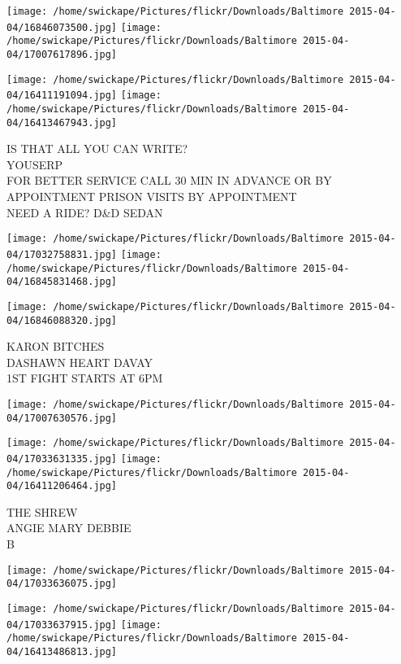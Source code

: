 \documentclass[10pt,letterpaper]{article}
\begin{document}
\texttt{[image: /home/swickape/Pictures/flickr/Downloads/Baltimore 2015-04-04/16846073500.jpg]}
\texttt{[image: /home/swickape/Pictures/flickr/Downloads/Baltimore 2015-04-04/17007617896.jpg]}

\texttt{[image: /home/swickape/Pictures/flickr/Downloads/Baltimore 2015-04-04/16411191094.jpg]}
\texttt{[image: /home/swickape/Pictures/flickr/Downloads/Baltimore 2015-04-04/16413467943.jpg]}

IS THAT ALL YOU CAN WRITE?\\
YOUSERP\\
FOR BETTER SERVICE CALL 30 MIN IN ADVANCE OR BY APPOINTMENT PRISON VISITS BY APPOINTMENT\\
NEED A RIDE?  D\&D SEDAN\\
\pagebreak

\texttt{[image: /home/swickape/Pictures/flickr/Downloads/Baltimore 2015-04-04/17032758831.jpg]}
\texttt{[image: /home/swickape/Pictures/flickr/Downloads/Baltimore 2015-04-04/16845831468.jpg]}

\texttt{[image: /home/swickape/Pictures/flickr/Downloads/Baltimore 2015-04-04/16846088320.jpg]}

KARON BITCHES\\
DASHAWN HEART DAVAY\\
1ST FIGHT STARTS AT 6PM\\
\pagebreak

\texttt{[image: /home/swickape/Pictures/flickr/Downloads/Baltimore 2015-04-04/17007630576.jpg]}

\vspace{0.25in}
\texttt{[image: /home/swickape/Pictures/flickr/Downloads/Baltimore 2015-04-04/17033631335.jpg]}
\texttt{[image: /home/swickape/Pictures/flickr/Downloads/Baltimore 2015-04-04/16411206464.jpg]}

THE SHREW\\
ANGIE MARY DEBBIE\\
B\\
\pagebreak

\texttt{[image: /home/swickape/Pictures/flickr/Downloads/Baltimore 2015-04-04/17033636075.jpg]}

\vspace{0.25in}
\texttt{[image: /home/swickape/Pictures/flickr/Downloads/Baltimore 2015-04-04/17033637915.jpg]}
\texttt{[image: /home/swickape/Pictures/flickr/Downloads/Baltimore 2015-04-04/16413486813.jpg]}
\end{document}

